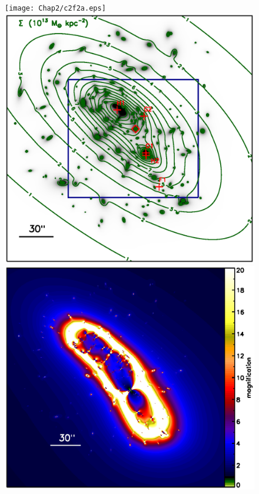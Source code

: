 \begin{figure}[h]
\centering
\texttt{[image: Chap2/c2f2a.eps]}\\
\includegraphics[height=0.28\textheight]{Chap2/c2f2b.eps}
\includegraphics[height=0.28\textheight]{Chap2/c2f2c.eps}

\end{figure}
